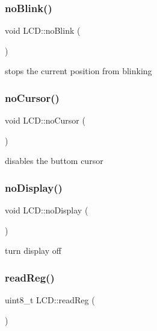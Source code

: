 \subsubsection{\texorpdfstring{no\+Blink()}{noBlink()}}
{\footnotesize\ttfamily void L\+C\+D\+::no\+Blink (\begin{DoxyParamCaption}{ }\end{DoxyParamCaption})}



stops the current position from blinking 

\mbox{\label{class_l_c_d_aec8ffaa1e69c7a6e13ac0cfbc29151d9}} 
\subsubsection{\texorpdfstring{no\+Cursor()}{noCursor()}}
{\footnotesize\ttfamily void L\+C\+D\+::no\+Cursor (\begin{DoxyParamCaption}{ }\end{DoxyParamCaption})}



disables the buttom cursor 

\mbox{\label{class_l_c_d_af3974da6d988ba2d21c25135ada12108}} 
\subsubsection{\texorpdfstring{no\+Display()}{noDisplay()}}
{\footnotesize\ttfamily void L\+C\+D\+::no\+Display (\begin{DoxyParamCaption}{ }\end{DoxyParamCaption})}



turn display off 

\mbox{\label{class_l_c_d_a7ee8acb9ba87f391991d6fa6c5ac861a}} 
\subsubsection{\texorpdfstring{read\+Reg()}{readReg()}}
{\footnotesize\ttfamily uint8\+\_\+t L\+C\+D\+::read\+Reg (\begin{DoxyParamCaption}{ }\end{DoxyParamCaption})}



